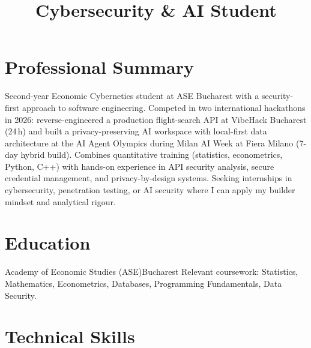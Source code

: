 \documentclass[11pt, a4paper]{moderncv}
\title{Cybersecurity \& AI Student}
\begin{document}
\makecvtitle

\section{Professional Summary}
Second-year Economic Cybernetics student at ASE Bucharest with a security-first
approach to software engineering. Competed in two international hackathons in 2026:
reverse-engineered a production flight-search API at VibeHack Bucharest (24\,h) and
built a privacy-preserving AI workspace with local-first data architecture at the
AI Agent Olympics during Milan AI Week at Fiera Milano (7-day hybrid build).
Combines quantitative training (statistics, econometrics, Python, C++) with hands-on
experience in API security analysis, secure credential management, and privacy-by-design
systems. Seeking internships in cybersecurity, penetration testing, or AI security
where I can apply my builder mindset and analytical rigour.

\section{Education}

%
        {Academy of Economic Studies (ASE)}{Bucharest}{}{
  Relevant coursework: Statistics, Mathematics, Econometrics, Databases, Programming Fundamentals, Data Security.
}

\section{Technical Skills}


\end{document}
